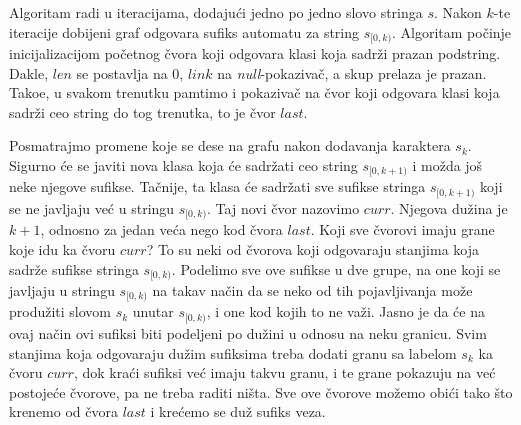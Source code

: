 \noindent
\begin{minipage}[l]{\textwidth}

\end{minipage}

Algoritam radi u iteracijama, dodaju\' ci jedno po jedno slovo stringa $s$. Nakon $k$-te iteracije dobijeni graf odgovara sufiks automatu za string $s_{[0, k)}$. Algoritam po\v cinje inicijalizacijom po\v cetnog \v cvora koji odgovara klasi koja sadr\v zi prazan podstring. Dakle, $len$ se postavlja na $0$, $link$ na \textit{null}-pokaziva\v c, a skup prelaza je prazan. Tako\dj e, u svakom trenutku pamtimo i pokaziva\v c na \v cvor koji odgovara klasi koja sadr\v zi ceo string do tog trenutka, to je \v cvor $last$.

Posmatrajmo promene koje se dese na grafu nakon dodavanja karaktera $s_k$. Sigurno \' ce se javiti nova klasa koja \' ce sadr\v zati ceo string $s_{[0, k+1)}$ i mo\v zda jo\v s neke njegove sufikse. Ta\v cnije, ta klasa \' ce sadr\v zati sve sufikse stringa $s_{[0, k+1)}$ koji se ne javljaju ve\' c u stringu $s_{[0, k)}$. Taj novi \v cvor nazovimo $curr$. Njegova du\v zina je $k+1$, odnosno za jedan ve\' ca nego kod \v cvora $last$. Koji sve \v cvorovi imaju grane koje idu ka \v cvoru $curr$? To su neki od \v cvorova koji odgovaraju stanjima koja sadr\v ze sufikse stringa $s_{[0,k)}$. Podelimo sve ove sufikse u dve grupe, na one koji se javljaju u stringu $s_{[0,k)}$ na takav na\v cin da se neko od tih pojavljivanja mo\v ze produ\v ziti slovom $s_k$ unutar $s_{[0,k)}$, i one kod kojih to ne va\v zi. Jasno je da \' ce na ovaj na\v cin ovi sufiksi biti podeljeni po du\v zini u odnosu na neku granicu. Svim stanjima koja odgovaraju du\v zim sufiksima treba dodati granu sa labelom $s_k$ ka \v cvoru $curr$, dok kra\' ci sufiksi ve\' c imaju takvu granu, i te grane pokazuju na ve\' c postoje\' ce \v cvorove, pa ne treba raditi ni\v sta. Sve ove \v cvorove mo\v zemo obi\' ci tako \v sto krenemo od \v cvora $last$ i kre\' cemo se du\v z sufiks veza.

